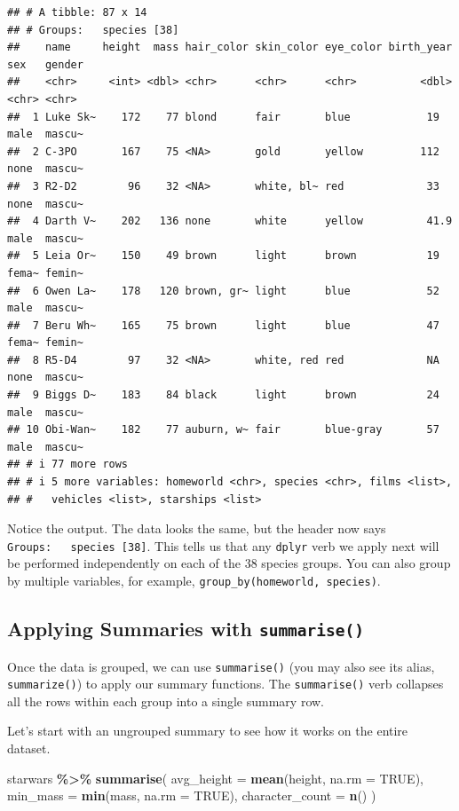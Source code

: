 \documentclass[
  11pt,
]{article}
\newenvironment{Shaded}{\begin{snugshade}}{\end{snugshade}}
\newcommand{\AttributeTok}[1]{\textcolor[rgb]{0.13,0.29,0.53}{#1}}
\newcommand{\ConstantTok}[1]{\textcolor[rgb]{0.56,0.35,0.01}{#1}}
\newcommand{\FunctionTok}[1]{\textcolor[rgb]{0.13,0.29,0.53}{\textbf{#1}}}
\newcommand{\NormalTok}[1]{#1}
\newcommand{\SpecialCharTok}[1]{\textcolor[rgb]{0.81,0.36,0.00}{\textbf{#1}}}
\begin{document}
\begin{verbatim}
## # A tibble: 87 x 14
## # Groups:   species [38]
##    name     height  mass hair_color skin_color eye_color birth_year sex   gender
##    <chr>     <int> <dbl> <chr>      <chr>      <chr>          <dbl> <chr> <chr> 
##  1 Luke Sk~    172    77 blond      fair       blue            19   male  mascu~
##  2 C-3PO       167    75 <NA>       gold       yellow         112   none  mascu~
##  3 R2-D2        96    32 <NA>       white, bl~ red             33   none  mascu~
##  4 Darth V~    202   136 none       white      yellow          41.9 male  mascu~
##  5 Leia Or~    150    49 brown      light      brown           19   fema~ femin~
##  6 Owen La~    178   120 brown, gr~ light      blue            52   male  mascu~
##  7 Beru Wh~    165    75 brown      light      blue            47   fema~ femin~
##  8 R5-D4        97    32 <NA>       white, red red             NA   none  mascu~
##  9 Biggs D~    183    84 black      light      brown           24   male  mascu~
## 10 Obi-Wan~    182    77 auburn, w~ fair       blue-gray       57   male  mascu~
## # i 77 more rows
## # i 5 more variables: homeworld <chr>, species <chr>, films <list>,
## #   vehicles <list>, starships <list>
\end{verbatim}

Notice the output. The data looks the same, but the header now says
\texttt{Groups:\ \ \ species\ {[}38{]}}. This tells us that any
\texttt{dplyr} verb we apply next will be performed independently on
each of the 38 species groups. You can also group by multiple variables,
for example, \texttt{group\_by(homeworld,\ species)}.

\subsection{\texorpdfstring{Applying Summaries with
\texttt{summarise()}}{Applying Summaries with summarise()}}\label{applying-summaries-with-summarise}

Once the data is grouped, we can use \texttt{summarise()} (you may also
see its alias, \texttt{summarize()}) to apply our summary functions. The
\texttt{summarise()} verb collapses all the rows within each group into
a single summary row.

Let's start with an ungrouped summary to see how it works on the entire
dataset.

\begin{Shaded}
\begin{Highlighting}[]
\NormalTok{starwars }\SpecialCharTok{\%\textgreater{}\%}
  \FunctionTok{summarise}\NormalTok{(}
    \AttributeTok{avg\_height =} \FunctionTok{mean}\NormalTok{(height, }\AttributeTok{na.rm =} \ConstantTok{TRUE}\NormalTok{),}
    \AttributeTok{min\_mass =} \FunctionTok{min}\NormalTok{(mass, }\AttributeTok{na.rm =} \ConstantTok{TRUE}\NormalTok{),}
    \AttributeTok{character\_count =} \FunctionTok{n}\NormalTok{()}
\NormalTok{  )}
\end{Highlighting}
\end{Shaded}
\end{document}
